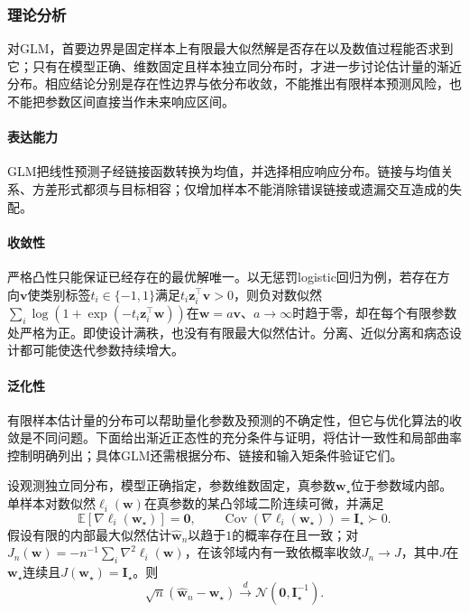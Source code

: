 \subsubsection{理论分析}
\label{sec:regression-glm-theory}

对GLM，首要边界是固定样本上有限最大似然解是否存在以及数值过程能否求到它；只有在模型正确、维数固定且样本独立同分布时，才进一步讨论估计量的渐近分布。相应结论分别是存在性边界与依分布收敛，不能推出有限样本预测风险，也不能把参数区间直接当作未来响应区间。

\paragraph{表达能力}
GLM把线性预测子经链接函数转换为均值，并选择相应响应分布。链接与均值关系、方差形式都须与目标相容；仅增加样本不能消除错误链接或遗漏交互造成的失配。

\paragraph{收敛性}
严格凸性只能保证已经存在的最优解唯一。以无惩罚logistic回归为例，若存在方向$\bm{v}$使类别标签$t_i\in\{-1,1\}$满足$t_i\bm{z}_i^{\top}\bm{v}>0$，则负对数似然$\sum_i\log(1+\exp(-t_i\bm{z}_i^{\top}\bm{w}))$在$\bm{w}=a\bm{v}$、$a\to\infty$时趋于零，却在每个有限参数处严格为正。即使设计满秩，也没有有限最大似然估计。分离、近似分离和病态设计都可能使迭代参数持续增大。

\paragraph{泛化性}
有限样本估计量的分布可以帮助量化参数及预测的不确定性，但它与优化算法的收敛是不同问题。下面给出渐近正态性的充分条件与证明，将估计一致性和局部曲率控制明确列出；具体GLM还需根据分布、链接和输入矩条件验证它们。

\begin{theorem}[正则GLM估计的渐近正态性]
  \label{thm:regression-glm-asymptotic}
  设观测独立同分布，模型正确指定，参数维数固定，真参数$\bm{w}_{\star}$位于参数域内部。单样本对数似然$\ell_i(\bm{w})$在真参数的某凸邻域二阶连续可微，并满足
  \[
    \mathbb{E}[\nabla\ell_i(\bm{w}_{\star})]=\bm{0},\qquad
    \operatorname{Cov}(\nabla\ell_i(\bm{w}_{\star}))=\bm{I}_{\star}\succ0.
  \]
  假设有限的内部最大似然估计$\widehat{\bm{w}}_n$以趋于$1$的概率存在且一致；对$J_n(\bm{w})=-n^{-1}\sum_i\nabla^2\ell_i(\bm{w})$，在该邻域内有一致依概率收敛$J_n\to J$，其中$J$在$\bm{w}_{\star}$连续且$J(\bm{w}_{\star})=\bm{I}_{\star}$。则
  \[
    \sqrt n(\widehat{\bm{w}}_n-\bm{w}_{\star})
      \xrightarrow{d}\mathcal{N}(\bm{0},\bm{I}_{\star}^{-1}).
  \]
\end{theorem}

